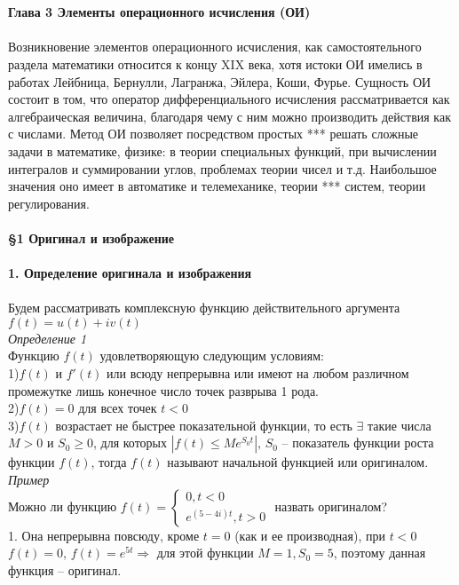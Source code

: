 \documentclass{article}
\numberwithin{equation}{section}
\begin{document}
\\\\
\textbf{\Large{Глава 3 Элементы операционного исчисления (ОИ)}}
\\\\
Возникновение элементов операционного исчисления, как самостоятельного раздела математики относится к концу XIX века, хотя истоки ОИ имелись в работах Лейбница, Бернулли, Лагранжа, Эйлера, Коши, Фурье. Сущность ОИ состоит в том, что оператор дифференциального исчисления рассматривается как алгебраическая величина, благодаря чему с ним можно производить действия как с числами. Метод ОИ позволяет посредством простых \colorbox{red!50}{***} решать сложные задачи в математике, физике: в теории специальных функций, при вычислении интегралов и суммировании углов, проблемах теории чисел и т.д. Наибольшое значения оно имеет в автоматике и телемеханике, теории \colorbox{red!50}{***} систем, теории регулирования.
\\\\
\textbf{\large{\S1 Оригинал и изображение}}
\\\\
\textbf{1. Определение оригинала и изображения}
\\\\
Будем рассматривать комплексную функцию действительного аргумента $f(t)=u(t)+iv(t)$\\
\textit{Определение 1}\\
Функцию $f(t)$ удовлетворяющую следующим условиям:\\
1)$f(t)$ и $f'(t)$ или всюду непрерывна или имеют на любом различном промежутке лишь конечное число точек разврыва 1 рода.\\
2)$f(t)=0$ для всех точек $t<0$\\
3)$f(t)$ возрастает не быстрее показательной функции, то есть $\exists$ такие числа $M>0$ и $S_0\geqslant0$, для которых $|f(t)\leqslant Me^{S_0t}|$, $S_0$ -- показатель функции роста функции $f(t)$, тогда $f(t)$ называют начальной функцией или оригиналом.\\
\textit{Пример}\\
Можно ли функцию $f(t)=\begin{cases}
0,t<0\\
e^{(5-4i)t},t>0
\end{cases}$ назвать оригиналом?\\
1. Она непрерывна повсюду, кроме $t=0$ (как и ее производная), при $t<0$ $f(t)=0$, $f(t)=e^{5t}\Rightarrow$ для этой функции $M=1,S_0=5$, поэтому данная функция -- оригинал.\\
\end{document}
